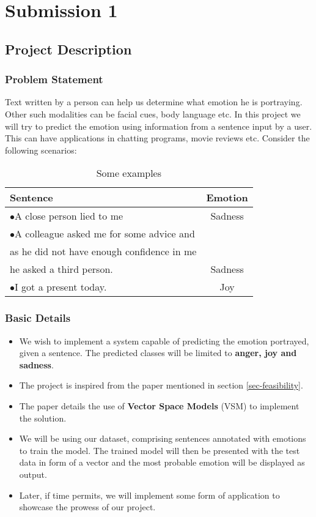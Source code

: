 \chapter{Submission 1}
\section{Project Description}
\subsection{Problem Statement}
Text written by a person can help us determine what emotion he is portraying. Other such modalities can be facial cues, body language etc. In this project we will try to predict the emotion using information from a sentence input by a user. This can have applications in chatting programs, movie reviews etc. Consider the following scenarios:

\begin{table}[ht!]
\centering
\label{tab-some-examples}
\begin{tabular}{l|c}
\textbf{Sentence} & \textbf{Emotion} \\
\hline
$\bullet$A close person lied to me & Sadness \\
$\bullet$A colleague asked me for some advice and & \\
as he did not have enough confidence in me & \\
he asked a third person. & Sadness \\
$\bullet$I got a present today. & Joy
\end{tabular}
\caption{Some examples}
\end{table}

\subsection{Basic Details}
\label{subsec-basic-details}
\begin{itemize}
\item We wish to implement a system capable of predicting the emotion portrayed, given a sentence. The predicted classes will be limited to \textbf{anger, joy and sadness}.
\item The project is inspired from the paper mentioned in section \ref{sec-feasibility}.
\item The paper details the use of \textbf{Vector Space Models} (VSM) to implement the solution.
\item We will be using our dataset, comprising sentences annotated with emotions to train the model. The trained model will then be presented with the test data in form of a vector and the most probable emotion will be displayed as output.
\item Later, if time permits, we will implement some form of application to showcase the prowess of our project.
\end{itemize}
